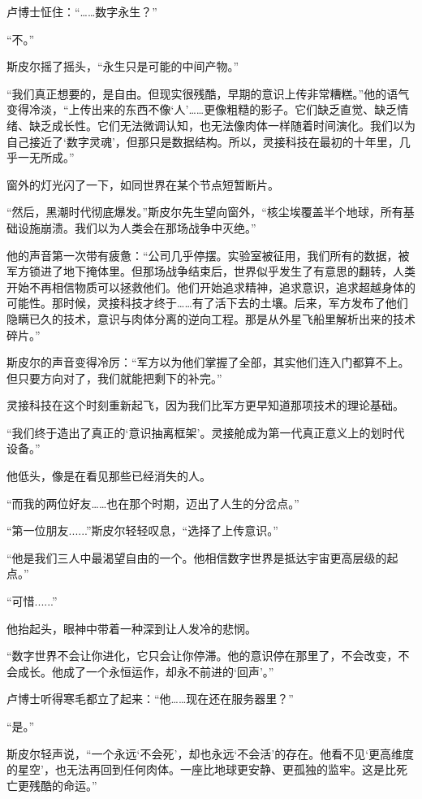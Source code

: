 卢博士怔住：“……数字永生？”

“不。”

斯皮尔摇了摇头，“永生只是可能的中间产物。”

“我们真正想要的，是自由。但现实很残酷，早期的意识上传非常糟糕。”他的语气变得冷淡，“上传出来的东西不像‘人’……更像粗糙的影子。它们缺乏直觉、缺乏情绪、缺乏成长性。它们无法微调认知，也无法像肉体一样随着时间演化。我们以为自己接近了‘数字灵魂’，但那只是数据结构。所以，灵接科技在最初的十年里，几乎一无所成。”

窗外的灯光闪了一下，如同世界在某个节点短暂断片。

“然后，黑潮时代彻底爆发。”斯皮尔先生望向窗外，“核尘埃覆盖半个地球，所有基础设施崩溃。我们以为人类会在那场战争中灭绝。”

他的声音第一次带有疲惫：“公司几乎停摆。实验室被征用，我们所有的数据，被军方锁进了地下掩体里。但那场战争结束后，世界似乎发生了有意思的翻转，人类开始不再相信物质可以拯救他们。他们开始追求精神，追求意识，追求超越身体的可能性。那时候，灵接科技才终于……有了活下去的土壤。后来，军方发布了他们隐瞒已久的技术，意识与肉体分离的逆向工程。那是从外星飞船里解析出来的技术碎片。”

斯皮尔的声音变得冷厉：“军方以为他们掌握了全部，其实他们连入门都算不上。但只要方向对了，我们就能把剩下的补完。”

灵接科技在这个时刻重新起飞，因为我们比军方更早知道那项技术的理论基础。

“我们终于造出了真正的‘意识抽离框架’。灵接舱成为第一代真正意义上的划时代设备。”

他低头，像是在看见那些已经消失的人。

“而我的两位好友……也在那个时期，迈出了人生的分岔点。”

“第一位朋友......”斯皮尔轻轻叹息，“选择了上传意识。”

“他是我们三人中最渴望自由的一个。他相信数字世界是抵达宇宙更高层级的起点。”

“可惜......”

他抬起头，眼神中带着一种深到让人发冷的悲悯。

“数字世界不会让你进化，它只会让你停滞。他的意识停在那里了，不会改变，不会成长。他成了一个永恒运作，却永不前进的‘回声’。”

卢博士听得寒毛都立了起来：“他……现在还在服务器里？”

“是。”

斯皮尔轻声说，“一个永远‘不会死’，却也永远‘不会活’的存在。他看不见‘更高维度的星空’，也无法再回到任何肉体。一座比地球更安静、更孤独的监牢。这是比死亡更残酷的命运。”

